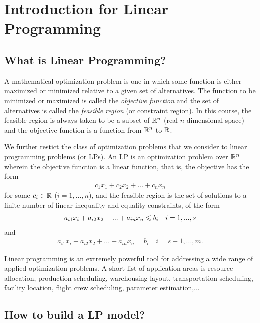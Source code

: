 \chapter{Introduction for Linear Programming}

\section{What is Linear Programming?}

A mathematical optimization problem is one 
in which some function is either maximized or minimized relative to a given set of alternatives.
The function to be minimized or maximized is called the \textit{objective function} 
and the set of alternatives is called the \textit{feasible region} (or constraint region).
In this course, the feasible region is always taken to be a subset of $\mathbb{R}^n$
(real $n$-dimensional space) and the objective function is a function from $\mathbb{R}^n$ to $\mathbb{R}$.
\par
We further restict the class of optimization problems that we consider to linear programming problems (or LPs).
An LP is an optimization problem over $\mathbb{R}^n$ wherein the objective function is a linear function, that is, the objective has the form
\begin{align*}
    c_1x_1+c_2x_2+...+c_nx_n
\end{align*}
for some $c_i\in \mathbb{R}$ ($i=1,...,n$), and the feasible region is the set of solutions
to a finite number of linear inequality and equality constraints, of the form 
\begin{align*}
    a_{i1}x_i+a_{i2}x_2 + ... + a_{in} x_n\leqslant b_i \quad i=1,...,s
\end{align*}
and 
\begin{align*}
    a_{i1}x_i+a_{i2}x_2+...+a_{in}x_n=b_i \quad i=s+1,...,m.
\end{align*}
\par
Linear programming is an extremely powerful tool for addressing a wide range of applied optimization problems.
A short list of application areas is resource allocation, production scheduling, warehousing layout, transportation scheduling, facility location, flight crew scheduling, parameter estimation,...

\section{How to build a LP model?}


